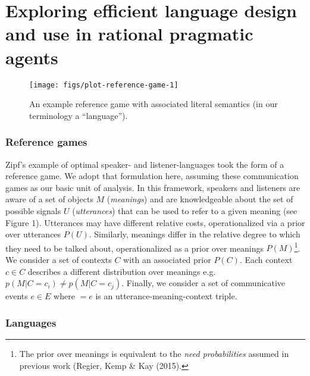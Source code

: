 \documentclass[10pt, letterpaper]{article}
\newenvironment{CodeChunk}{}{}
\begin{document}
\section{Exploring efficient language design and use in rational
pragmatic
agents}\label{exploring-efficient-language-design-and-use-in-rational-pragmatic-agents}

\begin{CodeChunk}
\begin{figure}[H]

{\centering \texttt{[image: figs/plot-reference-game-1]} 

}

\caption[An example reference game with associated literal semantics (in our terminology a ``language'')]{An example reference game with associated literal semantics (in our terminology a ``language'').}\label{fig:plot-reference-game}
\end{figure}
\end{CodeChunk}

\subsubsection{Reference games}\label{reference-games}

Zipf's example of optimal speaker- and listener-languages took the form
of a reference game. We adopt that formulation here, assuming these
communication games as our basic unit of analysis. In this framework,
speakers and listeners are aware of a set of objects \(M\)
(\emph{meanings}) and are knowledgeable about the set of possible
signals \(U\) (\emph{utterances}) that can be used to refer to a given
meaning (see Figure 1). Utterances may have different relative costs,
operationalized via a prior over utterances \(P(U)\). Similarly,
meanings differ in the relative degree to which they need to be talked
about, operationalized as a prior over meanings
\(P(M)\)\footnote{The prior over meanings is equivalent to the \textit{need probabilities} assumed in previous work (Regier, Kemp \& Kay (2015).}.
We consider a set of contexts \(C\) with an associated prior \(P(C)\).
Each context \(c\in C\) describes a different distribution over meanings
e.g. \(p(M|C=c_i) \neq p(M|C=c_j)\). Finally, we consider a set of
communicative events \(e \in E\) where \(<u, m, c> = e\) is an
utterance-meaning-context triple.\par

\subsubsection{Languages}\label{languages}
\end{document}
